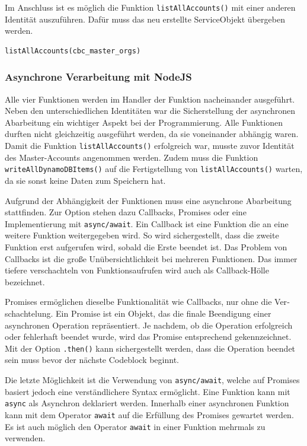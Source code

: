 Im Anschluss ist es möglich die Funktion \verb+listAllAccounts()+ mit einer anderen Identität auszuführen.
Dafür muss das neu erstellte ServiceObjekt übergeben werden.

\begin{lstlisting}[basicstyle=\ttfamily\small, breaklines=true , frame = single, backgroundcolor=\color{lightgray} ]
listAllAccounts(cbc_master_orgs)
\end{lstlisting}
\clearpage
\subsubsection{Asynchrone Verarbeitung mit NodeJS}
Alle vier Funktionen werden im Handler der Funktion nacheinander ausgeführt.
Neben den unterschiedlichen Identitäten war die Sicherstellung der asynchronen Abarbeitung ein wichtiger Aspekt bei der Programmierung.
Alle Funktionen durften nicht gleichzeitig ausgeführt werden, da sie voneinander abhängig waren.
Damit die Funktion \verb+listAllAccounts()+ erfolgreich war, musste zuvor Identität des Master-Accounts angenommen werden.
Zudem muss die Funktion \verb+writeAllDynamoDBItems()+ auf die Fertigstellung von \verb+listAllAccounts()+ warten, da sie sonst keine Daten zum Speichern hat.

Aufgrund der Abhängigkeit der Funktionen muss eine asynchrone Abarbeitung stattfinden.
Zur Option stehen dazu Callbacks, Promises oder eine Implementierung mit \verb+async/await+.
Ein Callback ist eine Funktion die an eine weitere Funktion weitergegeben wird.
So wird sichergestellt, dass die zweite Funktion erst aufgerufen wird, sobald die Erste beendet ist.
Das Problem von Callbacks ist die große Unübersichtlichkeit bei mehreren Funktionen.
Das immer tiefere verschachteln von Funktionsaufrufen wird auch als \glqq Callback-Hölle\grqq{} bezeichnet.

Promises ermöglichen dieselbe Funktionalität wie Callbacks, nur ohne die Ver­schach­telung.
\glqq Ein Promise ist ein Objekt, das die finale Beendigung einer asynchronen Operation repräsentiert.
Je nachdem, ob die Operation erfolgreich oder fehlerhaft beendet wurde, wird das Promise entsprechend gekennzeichnet. \grqq{} \cite{Promises}
Mit der Option \verb+.then()+ kann sichergestellt werden, dass die Operation beendet sein muss bevor der nächste Codeblock beginnt.

Die letzte Möglichkeit ist die Verwendung von \verb+async/await+, welche auf Promises basiert jedoch eine verständlichere Syntax ermöglicht.
Eine Funktion kann mit \verb+async+ als Asynchron deklariert werden.
Innerhalb einer asynchronen Funktion kann mit dem Operator \verb+await+ auf die Erfüllung des Promises gewartet werden.
Es ist auch möglich den Operator \verb+await+ in einer Funktion mehrmals zu verwenden.

